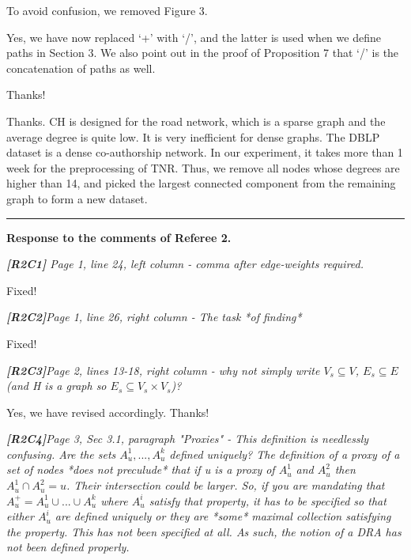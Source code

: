 \documentclass[11pt]{letter}
\newcommand{\vs}{\vspace{1ex}}
\newcommand{\svs}{\vspace{0.36ex}}
\begin{document}
\svs
To avoid confusion, we removed Figure 3.


\svs
Yes, we have now replaced `+' with `/', and the latter is used when we define paths in Section 3. 
We also point out in the proof of Proposition 7 that `/' is the concatenation of paths as well.

Thanks!


\svs
Thanks. CH is designed for the road network, which is a sparse graph and the average degree is quite low. It is very inefficient for dense graphs. The DBLP dataset is a dense co-authorship network. In our experiment, it takes more than 1 week for the preprocessing of TNR. Thus, we remove all nodes whose degrees are higher than 14, and picked the largest connected component from the remaining graph to form a new dataset.





\vspace{2.8ex}
\hrule
\vspace{0.6ex}
{\bf Response to the comments of Referee 2.}



\vs
\noindent
{\em
{\bf [R2C1]}
 Page 1, line 24, left column - comma after edge-weights required.}
\svs

Fixed!

\vs
\noindent
{\em
{\bf [R2C2]}Page 1, line 26, right column - The task *of finding*}
\svs

Fixed!

\vs
\noindent
{\em
{\bf [R2C3]}Page 2, lines 13-18, right column - why not simply write $V_s \subseteq V$, $E_s \subseteq E$ (and H is a graph so $E_s \subseteq V_s \times V_s$)?
}
\svs

Yes, we have revised accordingly. Thanks!


\vs
\noindent
{\em{\bf[R2C4]}Page 3, Sec 3.1, paragraph "Proxies" - This definition is needlessly confusing. Are the sets $A_u^1, ..., A_u^k$ defined uniquely? The definition of a proxy of a set of nodes *does not preculude* that
if u is a proxy of $A_u^1$ and $A_u^2$ then $A_u^1 \cap A_u^2 = {u}$.
Their intersection could be larger. So, if you are mandating that
$A_u^+ = A_u^1 \cup ... \cup A_u^k$ where $A_u^i$ satisfy that property,
it has to be specified so that either $A_u^i$ are defined uniquely or
they are *some* maximal collection satisfying the property. This
has not been specified at all. As such, the notion of a DRA has
not been defined properly.}
\svs
\end{document}
